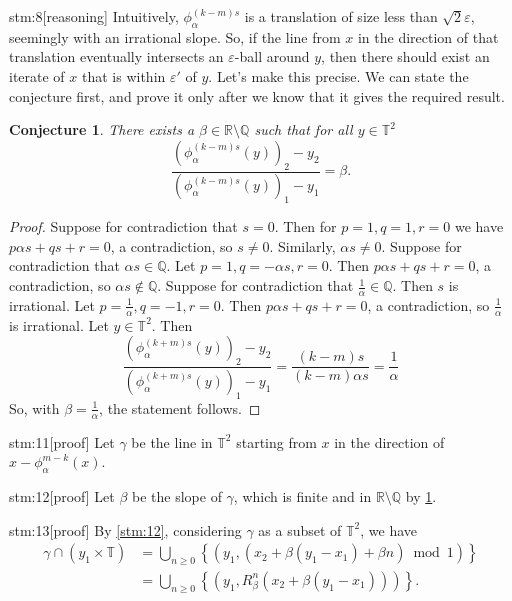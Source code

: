 \documentclass{article}
\newtheorem{conj}{Conjecture}
\begin{document}
\begin{stm}{stm:8}[reasoning]
Intuitively, $\phi_\alpha^{(k-m)s}$ is a translation of size less than $\sqrt{2} \varepsilon$, seemingly with an irrational slope. So, if the line from $x$ in the direction of that translation eventually intersects an $\varepsilon$-ball around $y$, then there should exist an iterate of $x$ that is within $\varepsilon'$ of $y$. Let's make this precise. We can state the conjecture first, and prove it only after we know that it gives the required result.
\end{stm}

\begin{conj}\label{conj:slope}
There exists a  $\beta \in \mathbb{R} \setminus \mathbb{Q}$ such that for all $y \in \mathbb{T}^2$
\[
\frac{(\phi_\alpha^{(k-m)s}(y))_2 - y_2}{(\phi_\alpha^{(k-m)s}(y))_1 - y_1} = \beta.
\]
\end{conj}

\begin{proof}
    Suppose for contradiction that $s = 0$. Then for $p = 1, q = 1, r = 0$ we have $p \alpha s + q s + r = 0$, a contradiction, so $s \ne 0$. Similarly, $\alpha s \ne 0$. Suppose for contradiction that $\alpha s \in \mathbb{Q}$. Let $p = 1, q = -\alpha s, r = 0$. Then $p \alpha s + q s + r = 0$, a contradiction, so $\alpha s \not\in \mathbb{Q}$. Suppose for contradiction that $\frac{1}{\alpha} \in \mathbb{Q}$. Then $s$ is irrational. Let $p = \frac{1}{\alpha}, q = -1, r = 0$. Then $p \alpha s + q s + r = 0$, a contradiction, so $\frac{1}{\alpha}$ is irrational. Let $y \in \mathbb{T}^2$. Then $$\frac{(\phi_\alpha^{(k+m)s}(y))_2 - y_2}{(\phi_\alpha^{(k+m)s}(y))_1 - y_1} = \frac{(k-m)s}{(k-m)\alpha s} = \frac{1}{\alpha}$$
    So, with $\beta = \frac{1}{\alpha}$, the statement follows.
\end{proof}

\begin{stm}{stm:11}[proof]
Let $\gamma$ be the line in $\mathbb{T}^2$ starting from $x$ in the direction of $x - \phi_\alpha^{m-k}(x)$.
\end{stm}

\begin{stm}{stm:12}[proof]
Let $\beta$ be the slope of $\gamma$, which is finite and in $\mathbb{R} \setminus \mathbb{Q}$ by \ref{conj:slope}.
\end{stm}

\begin{stm}{stm:13}[proof]
By \ref{stm:12}, considering $\gamma$ as a subset of $\mathbb{T}^2$, we have
\begin{align*}
\gamma \cap (y_1 \times \mathbb{T})
&= \bigcup_{n \ge 0} \left\{ \left( y_1, (x_2 + \beta(y_1 - x_1) + \beta n) \bmod 1 \right) \right\} \\
&= \bigcup_{n \ge 0} \left\{ \left( y_1, R_\beta^n(x_2 + \beta(y_1 - x_1)) \right) \right\}.
\end{align*}
\end{stm}
\end{document}

